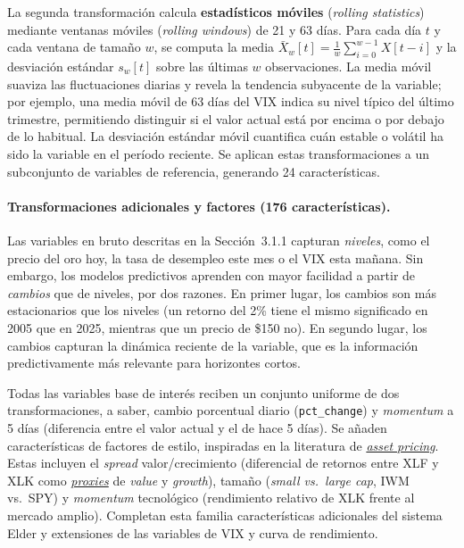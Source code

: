 La segunda transformaci\'on calcula \textbf{estad\'isticos m\'oviles} (\textit{rolling statistics}) mediante ventanas m\'oviles (\textit{rolling windows}) de 21 y 63 d\'ias. Para cada d\'ia $t$ y cada ventana de tama\~no $w$, se computa la media $\bar{X}_w[t] = \frac{1}{w}\sum_{i=0}^{w-1} X[t-i]$ y la desviaci\'on est\'andar $s_w[t]$ sobre las \'ultimas $w$ observaciones. La media m\'ovil suaviza las fluctuaciones diarias y revela la tendencia subyacente de la variable; por ejemplo, una media m\'ovil de 63 d\'ias del VIX indica su nivel t\'ipico del \'ultimo trimestre, permitiendo distinguir si el valor actual est\'a por encima o por debajo de lo habitual. La desviaci\'on est\'andar m\'ovil cuantifica cu\'an estable o vol\'atil ha sido la variable en el per\'iodo reciente. Se aplican estas transformaciones a un subconjunto de variables de referencia, generando 24 caracter\'isticas.

\paragraph{Transformaciones adicionales y factores (176 caracter\'isticas).}
Las variables en bruto descritas en la Secci\'on~3.1.1 capturan \textit{niveles}, como el precio del oro hoy, la tasa de desempleo este mes o el VIX esta ma\~nana. Sin embargo, los modelos predictivos aprenden con mayor facilidad a partir de \textit{cambios} que de niveles, por dos razones. En primer lugar, los cambios son m\'as estacionarios que los niveles (un retorno del 2\% tiene el mismo significado en 2005 que en 2025, mientras que un precio de \$150 no). En segundo lugar, los cambios capturan la din\'amica reciente de la variable, que es la informaci\'on predictivamente m\'as relevante para horizontes cortos.

Todas las variables base de inter\'es reciben un conjunto uniforme de dos transformaciones, a saber, cambio porcentual diario (\texttt{pct\_change}) y \textit{momentum} a 5 d\'ias (diferencia entre el valor actual y el de hace 5 d\'ias). Se a\~naden caracter\'isticas de factores de estilo, inspiradas en la literatura de \hyperlink{glos:factores_estilo}{\textit{asset pricing}}. Estas incluyen el \textit{spread} valor/crecimiento (diferencial de retornos entre XLF y XLK como \hyperlink{glos:proxy}{\textit{proxies}} de \textit{value} y \textit{growth}), tama\~no (\textit{small vs.\ large cap}, IWM vs.\ SPY) y \textit{momentum} tecnol\'ogico (rendimiento relativo de XLK frente al mercado amplio). Completan esta familia caracter\'isticas adicionales del sistema Elder y extensiones de las variables de VIX y curva de rendimiento.

